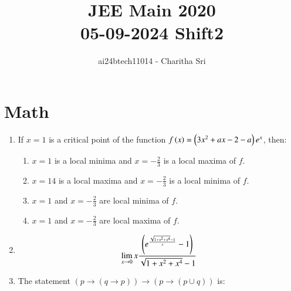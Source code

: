 \documentclass[journal,12pt,onecolumn]{IEEEtran}
\theoremstyle{remark}
\begin{document}

\vspace{3cm}

\title{JEE Main 2020 \\ 05-09-2024 Shift2}
\author{ai24btech11014 - Charitha Sri}

\maketitle
\bigskip       
\renewcommand{\thefigure}{\theenumi}
\renewcommand{\thetable}{\theenumi}



\section{Math}                                                      
\begin{enumerate}                     
\item If $x=1$ is a critical point of the function $f\left(x\right) = \left(3x^{2}+ax-2-a\right)e^{x}$, then:        
\begin{enumerate}                            
\item $x=1$ is a local minima and $x = -\frac{2}{3}$ is a local maxima of $f$.          
\item $x=14$ is a local maxima and $x=-\frac{2}{3}$ is a local minima of $f$.            
\item $x=1$ and $x=-\frac{2}{3}$ are local minima of $f$.           
\item $x=1$ and $x=-\frac{2}{3}$ are local maxima of $f$.       
\end{enumerate}
\item
	  \begin{align}
		  \lim_{x \to 0}x\frac{\left({e}^{\frac{\sqrt{1+x^{2}+x^{4}} - 1}{x}} -1 \right)}{\sqrt{1+x^{2}+x^{4}} - 1}
	  \end{align}
\begin{enumerate}
  \end{enumerate}
 \item The statement $(p \rightarrow (q \rightarrow p)) \rightarrow (p \rightarrow (p \cup q))$ is:

\end{enumerate}
\end{document}

